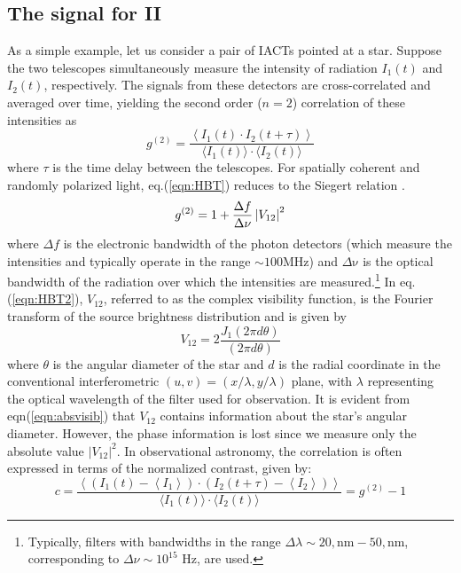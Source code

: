 \subsection{The signal for II}\label{sec:signal}
As a simple example, let us consider a pair of IACTs pointed at a star. Suppose the two telescopes simultaneously measure the intensity of radiation $I_1(t)$ and $I_2(t)$, respectively. The signals from these detectors are cross-correlated and averaged over time, yielding the second order ($n=2$) correlation of these intensities as \citep{acciari2020optical, dravins2013optical}
\begin{equation}
	g^{(2)}= \frac{\left\langle I_1(t) \cdot I_2(t + \tau) \right\rangle}{\langle I_1(t) \rangle \cdot \langle I_2(t) \rangle} 
	\label{eqn:HBT}
\end{equation}
where $\tau$ is the time delay between the telescopes. For spatially coherent and randomly polarized light, eq.(\ref{eqn:HBT}) reduces to the Siegert relation \citep{acciari2020optical}.
\begin{equation}
	g^{(2)} = 1 + \frac{\Delta f}{\Delta \nu} \left|V_{12}\right|^2
	\label{eqn:HBT2}
\end{equation}
where $\Delta f$ is the electronic bandwidth of the photon detectors (which measure the intensities and typically operate in the range $\sim 100 {\mathrm {MHz}}$) and $\Delta {\mathrm {\nu}}$ is the optical bandwidth of the radiation over which the intensities are measured.\footnote{Typically, filters with bandwidths in the range $\Delta \lambda \sim 20,\mathrm{nm} - 50,\mathrm{nm}$, corresponding to $\Delta \nu \sim 10^{15}$ Hz, are used.} In eq.(\ref{eqn:HBT2}), $V_{12}$, referred to as the complex visibility function, is the Fourier transform of the source brightness distribution and is given by
\begin{equation}
 V_{12} = 2 \frac{J_1(2 \pi d \theta)}{(2 \pi d \theta)}
\label{eqn:absvisib}
\end{equation}
where $\theta$ is the angular diameter of the star and $d$ is the radial coordinate in the conventional interferometric $(u , v) = (x/\lambda, y/\lambda)$ plane, with $\lambda$ representing the optical wavelength of the filter used for observation. It is evident from eqn(\ref{eqn:absvisib}) that $V_{12}$ contains information about the star's angular diameter. However, the phase information is lost since we measure only the absolute value $\vert V_{12} \vert^2$. In observational astronomy, the correlation is often expressed in terms of the normalized contrast, given by:
\begin{equation}
	c = \frac{\left\langle \left( I_1(t) - \left\langle I_1 \right\rangle \right) \cdot \left( I_2(t + \tau) - \left\langle I_2 \right\rangle \right) \right\rangle}{\langle I_1(t) \rangle \cdot \langle I_2(t) \rangle} = g^{(2)} - 1
\end{equation}
